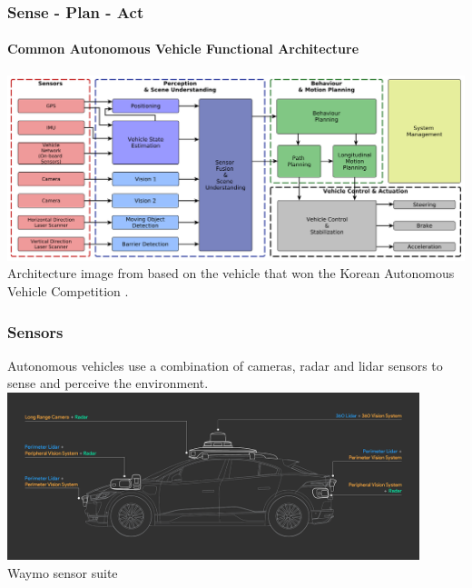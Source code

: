 \begin{frame}
\frametitle{Sense - Plan - Act}
\framesubtitle{Common Autonomous Vehicle Functional Architecture}
\includegraphics[width=\textwidth]{images/tas_2016_fig4_av_functional_architecture.png}
\tiny{Architecture image from \cite{Tas2016-sd} based on the vehicle that won the
Korean Autonomous Vehicle Competition \cite{Jo2014-na}}.
\end{frame}

\begin{frame}
\frametitle{Sensors}
Autonomous vehicles use a combination of cameras, radar and lidar sensors to
sense and perceive the environment. \\
\vspace{0.25cm}
\centering
\includegraphics[width=0.9\textwidth]{images/waymo_sensors.png}\\
\footnotesize{Waymo sensor suite\footnotemark[1]}
\end{frame}

